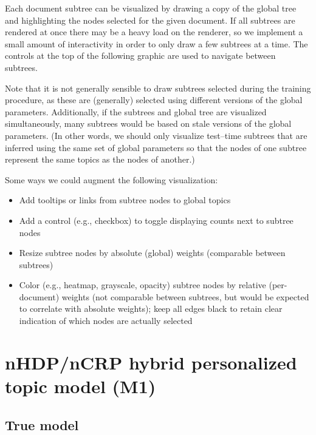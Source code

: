\documentclass{article}
\begin{document}
Each document subtree can be visualized by drawing a copy of the global tree and highlighting the nodes selected for the given document.  If all subtrees are rendered at once there may be a heavy load on the renderer, so we implement a small amount of interactivity in order to only draw a few subtrees at a time.  The controls at the top of the following graphic are used to navigate between subtrees.

Note that it is not generally sensible to draw subtrees selected during the training procedure, as these are (generally) selected using different versions of the global parameters.  Additionally, if the subtrees and global tree are visualized simultaneously, many subtrees would be based on stale versions of the global parameters.  (In other words, we should only visualize test--time subtrees that are inferred using the same set of global parameters so that the nodes of one subtree represent the same topics as the nodes of another.)

Some ways we could augment the following visualization:
\begin{itemize}
\item Add tooltips or links from subtree nodes to global topics
\item Add a control (e.g., checkbox) to toggle displaying counts next to subtree nodes
\item Resize subtree nodes by absolute (global) weights (comparable between subtrees)
\item Color (e.g., heatmap, grayscale, opacity) subtree nodes by relative (per-document) weights (not comparable between subtrees, but would be expected to correlate with absolute weights); keep all edges black to retain clear indication of which nodes are actually selected
\end{itemize}






\section*{nHDP/nCRP hybrid personalized topic model (M1)}

\subsection*{True model}
\end{document}
